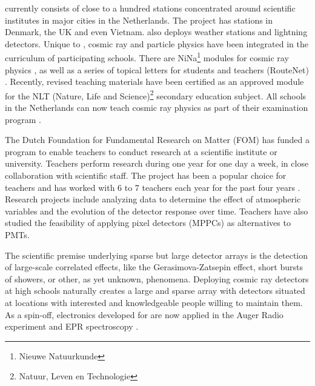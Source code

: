 \hisparc currently consists of close to a hundred stations concentrated around
scientific institutes in major cities in the Netherlands. The project has
stations in Denmark, the UK and even Vietnam. \hisparc also deploys weather
stations and lightning detectors. Unique to \hisparc, cosmic ray and particle
physics have been integrated in the curriculum of participating schools. There
are NiNa\footnote{Nieuwe Natuurkunde} modules for cosmic ray physics
\cite{NiNa-module},
as well as a series of topical letters for students and teachers
(RouteNet) \cite{RouteNet}. Recently, revised teaching materials have been
certified as an approved module for the NLT (Nature, Life and
Science)\footnote{Natuur, Leven en Technologie} secondary education subject. All
schools in the Netherlands can now teach cosmic ray physics as part of their
examination program \cite{NLT-module}.

The Dutch Foundation for Fundamental Research on Matter (FOM) has funded a
program to enable teachers to conduct research at a scientific institute or
university.
Teachers perform research during one year for one day a week, in close
collaboration with scientific staff. The \hisparc project has been a popular
choice for teachers and has worked with 6 to 7 teachers each year for the past
four years \cites{LIO:2009}{LIO:2010}{LIO:2011}. Research projects include
analyzing \hisparc data to determine the effect of atmospheric variables and the
evolution of the detector response over time. Teachers have also studied the
feasibility of applying pixel detectors (MPPCs) as alternatives to PMTs.

The scientific premise underlying sparse but large detector arrays is the detection of
large-scale correlated effects, like the Gerasimova-Zatsepin effect, short
bursts of showers, or other, as yet unknown, phenomena.  Deploying cosmic ray
detectors at high schools naturally creates a large and sparse array with
detectors situated at locations with interested and knowledgeable people willing to
maintain them. As a spin-off, electronics developed for \hisparc are now applied
in the Auger Radio experiment \cite{Coppens:2009} and EPR spectroscopy
\cite{FLARE}.

